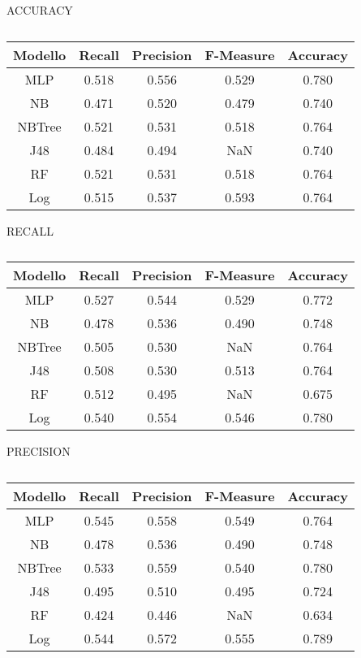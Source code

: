 ACCURACY
\begin{table}[H]
\tabcolsep=0.10cm
\small
\begin{tabular}{c c c c c}
     Modello & Recall & Precision & F-Measure & Accuracy  \\
     \hline
     MLP & 0.518 & 0.556 & 0.529 & 0.780 \\
     NB & 0.471 & 0.520 & 0.479 & 0.740 \\
     NBTree & 0.521 & 0.531 & 0.518 & 0.764 \\
     J48 & 0.484 & 0.494 & NaN & 0.740 \\
     RF & 0.521 & 0.531 & 0.518 & 0.764 \\
     Log & 0.515 & 0.537 & 0.593 & 0.764 \\
     \hline
\end{tabular}
\caption{}
\end{table}

RECALL
\begin{table}[H]
\tabcolsep=0.10cm
\small
\begin{tabular}{c c c c c}
     Modello & Recall & Precision & F-Measure & Accuracy  \\
     \hline
     MLP & 0.527 & 0.544 & 0.529 & 0.772 \\
     NB & 0.478 & 0.536 & 0.490 & 0.748 \\
     NBTree & 0.505 & 0.530 & NaN & 0.764 \\
     J48 & 0.508 & 0.530 & 0.513 & 0.764 \\
     RF & 0.512 & 0.495 & NaN & 0.675 \\
     Log & 0.540 & 0.554 & 0.546 & 0.780 \\
     \hline
\end{tabular}
\caption{}
\end{table}

PRECISION

\begin{table}[H]
\tabcolsep=0.10cm
\small
\begin{tabular}{c c c c c}
     Modello & Recall & Precision & F-Measure & Accuracy  \\
     \hline
     MLP & 0.545 & 0.558 & 0.549 & 0.764 \\
     NB & 0.478 & 0.536 & 0.490 & 0.748 \\
     NBTree & 0.533 & 0.559 & 0.540 & 0.780 \\
     J48 & 0.495 & 0.510 & 0.495 & 0.724\\
     RF & 0.424 & 0.446 & NaN & 0.634 \\
     Log & 0.544 & 0.572 & 0.555 & 0.789 \\
     \hline
\end{tabular}
\caption{}
\end{table}

